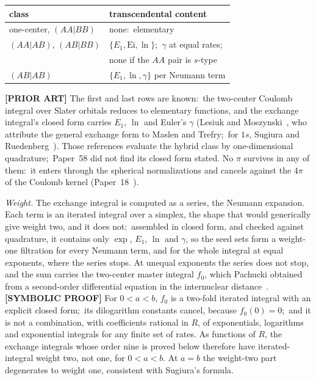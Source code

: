 \documentclass[aps,pra,twocolumn,superscriptaddress,longbibliography]{revtex4-2}
\begin{document}
\begin{center}
\small
\begin{tabular}{@{}ll@{}}
\toprule
class & transcendental content \\
\midrule
one-center, $(AA|BB)$ & none:\ elementary \\
$(AA|AB)$, $(AB|BB)$ & $\{E_1,\mathrm{Ei},\ln\}$;\ $\gamma$ at equal rates;\\
 & none if the $AA$ pair is $s$-type \\
$(AB|AB)$ & $\{E_1,\ln,\gamma\}$ per Neumann term \\
\bottomrule
\end{tabular}
\end{center}

\noindent \textbf{[PRIOR ART]} The first and last rows are known:\ the
two-center Coulomb integral over Slater orbitals reduces to elementary
functions, and the exchange integral's closed form carries $E_1$, $\ln$
and Euler's $\gamma$ (Lesiuk and
Moszynski~\cite{lesiuk2014a,lesiuk2014b}, who attribute the general
exchange form to Maslen and Trefry;\ for $1s$, Sugiura and
Ruedenberg~\cite{sugiura1927,ruedenberg1951}).  Those references evaluate
the hybrid class by one-dimensional quadrature;\ Paper~58 did not find
its closed form stated.  No $\pi$ survives in any of them:\ it enters
through the spherical normalizations and cancels against the $4\pi$ of
the Coulomb kernel (Paper~18~\cite{loutey_paper18}).

\emph{Weight.}  The exchange integral is computed as a series, the
Neumann expansion.  Each term is an iterated integral over a simplex, the
shape that would generically give weight two, and it does not:\
assembled in closed form, and checked against quadrature, it contains
only $\exp$, $E_1$, $\ln$ and $\gamma$, so the seed sets form a
weight-one filtration for every Neumann term, and for the whole integral
at equal exponents, where the series stops.  At unequal exponents the series does not stop,
and the sum carries the two-center master integral $f_0$, which Pachucki
obtained from a second-order differential equation in the internuclear
distance~\cite{pachucki2009}.  \textbf{[SYMBOLIC PROOF]} For $0<a<b$,
$f_0$ is a two-fold iterated integral with an explicit closed form;\ its
dilogarithm constants cancel, because $f_0(0)=0$;\ and it is not a
combination, with coefficients rational in $R$, of exponentials,
logarithms and exponential integrals for any finite set of rates.  As
functions of $R$, the exchange integrals whose order nine is proved
below therefore have iterated-integral weight two, not one, for $0<a<b$.
At $a=b$ the weight-two part degenerates to weight one, consistent with
Sugiura's formula.
\end{document}

